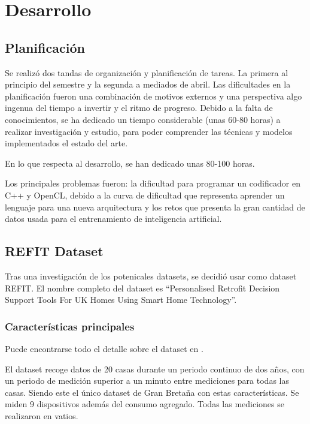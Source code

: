 \chapter{Desarrollo}
\label{ch:desarrollo}


\section{Planificación}
\label{sec:planificacion}
Se realizó dos tandas de organización y planificación de tareas. La primera al principio del semestre y la segunda a mediados de abril. 
Las dificultades en la planificación fueron una combinación de motivos externos y una perspectiva algo ingenua del tiempo a invertir y el ritmo de progreso.
Debido a la falta de conocimientos, se ha dedicado un tiempo considerable (unas 60-80 horas) a realizar investigación y estudio, para poder comprender las técnicas y modelos implementados el estado del arte.

En lo que respecta al desarrollo, se han dedicado unas 80-100 horas.

Los principales problemas fueron: la dificultad para programar un codificador en C++ y OpenCL, debido a la curva de dificultad que representa aprender un lenguaje para una nueva arquitectura y los retos que presenta la gran cantidad de datos usada para el entrenamiento de inteligencia artificial. 


\section{REFIT Dataset}
Tras una investigación de los potenicales datasets, se decidió usar como dataset REFIT. El nombre completo del dataset es \enquote{Personalised Retrofit Decision Support Tools For UK Homes Using Smart Home Technology}\autocite{REFIT}.
\subsection{Características principales}
Puede encontrarse todo el detalle sobre el dataset en \autocite{REFIT}.

El dataset recoge datos de 20 casas durante un periodo continuo de dos años, con un periodo de medición superior a un minuto entre mediciones para todas las casas. Siendo este el único dataset de Gran Bretaña con estas características.
Se miden 9 dispositivos además del consumo agregado. Todas las mediciones se realizaron en vatios. 


